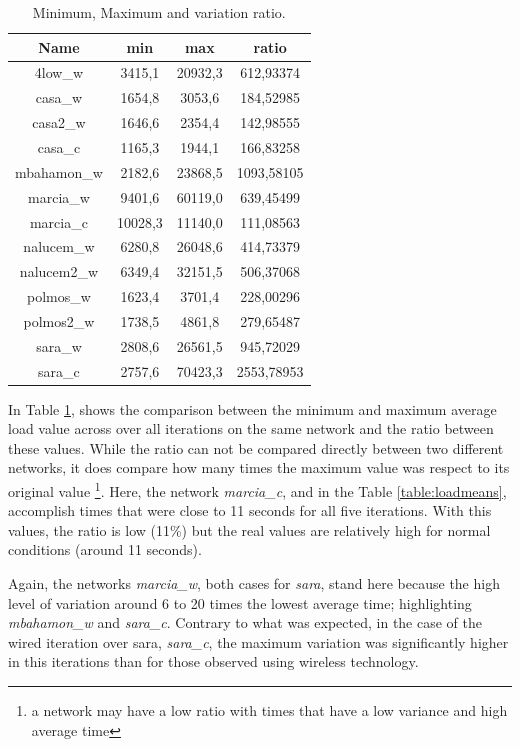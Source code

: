 \begin{table}[ht]
\begin{center}
\begin{tabular}{|c||c|c|c||}
 \hline
Name 			& min		& max		& ratio  	\\ \hline \hline
4low\_w 		& 3415,1	& 20932,3	& 612,93374 \\ \hline 
casa\_w 		& 1654,8	& 3053,6	& 184,52985 \\ \hline 
casa2\_w		& 1646,6	& 2354,4	& 142,98555	\\ \hline 
casa\_c			& 1165,3	& 1944,1	& 166,83258	\\ \hline 
mbahamon\_w		& 2182,6	& 23868,5	& 1093,58105\\ \hline 
marcia\_w		& 9401,6	& 60119,0	& 639,45499	\\ \hline 
marcia\_c		& 10028,3	& 11140,0	& 111,08563	\\ \hline 
nalucem\_w 		& 6280,8	& 26048,6	& 414,73379	\\ \hline 
nalucem2\_w 	& 6349,4	& 32151,5	& 506,37068	\\ \hline 
polmos\_w 		& 1623,4	& 3701,4	& 228,00296	\\ \hline 
polmos2\_w 		& 1738,5	& 4861,8	& 279,65487	\\ \hline 
sara\_w 		& 2808,6	& 26561,5	& 945,72029	\\ \hline 
sara\_c 		& 2757,6	& 70423,3	& 2553,78953\\ \hline 
\end{tabular}
\caption[Page Benchmark: Minimum, Maximum and variation ratio.]{Minimum, Maximum and variation ratio.}
\label{table:varatio}
\end{center}
\end{table}

In Table \ref{table:varatio}, shows the comparison between the minimum
and maximum average load value across over all iterations on the same network
and the ratio between these values. While the ratio can not be compared
directly between two different networks, it does compare how many times the
maximum value was respect to its original value \footnote{a network may have a
low ratio with times that have a low variance and high average time}. Here,
the network \emph{marcia\_c}, and in the Table \ref{table:loadmeans},
accomplish times that were close to 11 seconds for all five iterations. With
this values, the ratio is low (11\%) but the real values are relatively high
for normal conditions (around 11 seconds).

Again, the networks \emph{marcia\_w}, both cases for \emph{sara}, stand
here because the high level of variation around 6 to 20 times the lowest
average time; highlighting \emph{mbahamon\_w} and \emph{sara\_c}. Contrary
to what was expected, in the case of the wired iteration over sara,
\emph{sara\_c}, the maximum variation was significantly higher in this
iterations than for those observed using wireless technology.

